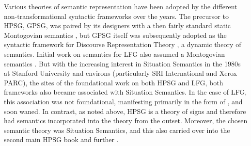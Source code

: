 %
%
%

Various theories of semantic representation have been adopted by the different non-transformational syntactic frameworks over the years.  
The precursor to HPSG, GPSG, was paired by its designers with a then fairly standard static Montogovian semantics \citep{GKPS85a}, but GPSG itself was subsequently adopted as the syntactic framework for Discourse Representation Theory \citep{kamp;reyle93}, a dynamic theory of semantics.  Initial work on semantics for LFG also assumed a Montogovian semantics \citep{halvorsen83,halvorsen;kaplan88}.  But with the increasing interest in Situation Semantics \citep{barwise;perry83} in the 1980s at Stanford University and environs (particularly SRI International and Xerox PARC), the sites of the foundational work on both HPSG and LFG, both frameworks also became associated with Situation Semantics.  In the case of LFG, this association was not foundational, manifesting primarily in the form of \citet{fenstad;ea87}, and soon waned. In contrast, as noted above, HPSG is a theory of signs and therefore had semantics incorporated into the theory from the outset.  Moreover, the chosen semantic theory was Situation Semantics, and this also carried over into the second main HPSG book \citep{ps2} and further \citep{ginzburg;sag00}.

